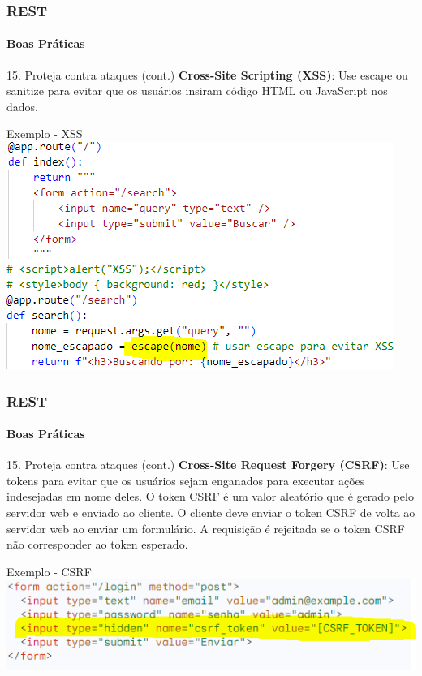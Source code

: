 \documentclass[
	9pt, %
	t, %
]{beamer}
\newcommand{\yellowbox}[1]{\colorbox{yellow!75}{#1}}
\begin{document}
\begin{frame}
	\frametitle{REST}
	\framesubtitle{Boas Práticas}

	\begin{block}{15. Proteja contra ataques (cont.)}
		\textbf{Cross-Site Scripting (XSS)}: Use \yellowbox{escape} ou \yellowbox{sanitize} para evitar que os usuários insiram código HTML ou JavaScript nos dados.
	\end{block}

	\begin{exampleblock}{Exemplo - XSS}
		\includegraphics[width=0.6\linewidth]{xss_example.png}
	\end{exampleblock}

\end{frame}

\begin{frame}
	\frametitle{REST}
	\framesubtitle{Boas Práticas}

	\begin{block}{15. Proteja contra ataques (cont.)}
		\textbf{Cross-Site Request Forgery (CSRF)}: Use \yellowbox{tokens} para evitar que os usuários sejam enganados para executar ações indesejadas em nome deles. O token CSRF é um valor aleatório que é gerado pelo servidor web e enviado ao cliente. O cliente deve enviar o token CSRF de volta ao servidor web ao enviar um formulário. A requisição é rejeitada se o token CSRF não corresponder ao token esperado.
	\end{block}

	\begin{exampleblock}{Exemplo - CSRF}
		\includegraphics[width=0.9\linewidth]{csrf_example.png}
	\end{exampleblock}

\end{frame}
\end{document}
